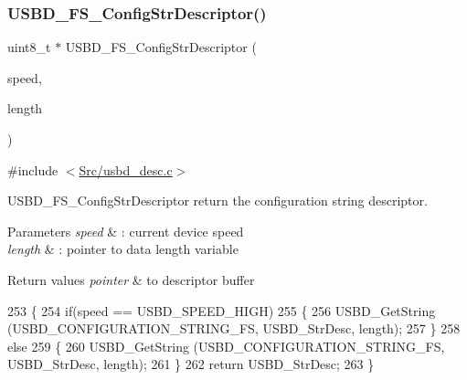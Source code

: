 \subsubsection{\texorpdfstring{U\+S\+B\+D\+\_\+\+F\+S\+\_\+\+Config\+Str\+Descriptor()}{USBD\_FS\_ConfigStrDescriptor()}}
{\footnotesize\ttfamily uint8\+\_\+t $\ast$ U\+S\+B\+D\+\_\+\+F\+S\+\_\+\+Config\+Str\+Descriptor (\begin{DoxyParamCaption}\item[{U\+S\+B\+D\+\_\+\+Speed\+Type\+Def}]{speed,  }\item[{uint16\+\_\+t $\ast$}]{length }\end{DoxyParamCaption})}



{\ttfamily \#include $<$\mbox{\hyperlink{usbd__desc_8c}{Src/usbd\+\_\+desc.\+c}}$>$}



U\+S\+B\+D\+\_\+\+F\+S\+\_\+\+Config\+Str\+Descriptor return the configuration string descriptor. 


\begin{DoxyParams}{Parameters}
{\em speed} & \+: current device speed \\
\hline
{\em length} & \+: pointer to data length variable \\
\hline
\end{DoxyParams}

\begin{DoxyRetVals}{Return values}
{\em pointer} & to descriptor buffer \\
\hline
\end{DoxyRetVals}

\begin{DoxyCode}
253 \{
254   \textcolor{keywordflow}{if}(speed  == USBD\_SPEED\_HIGH)
255   \{  
256     USBD\_GetString (USBD\_CONFIGURATION\_STRING\_FS, USBD\_StrDesc, length);
257   \}
258   \textcolor{keywordflow}{else}
259   \{
260     USBD\_GetString (USBD\_CONFIGURATION\_STRING\_FS, USBD\_StrDesc, length); 
261   \}
262   \textcolor{keywordflow}{return} USBD\_StrDesc;  
263 \}
\end{DoxyCode}
\mbox{\label{group___u_s_b_d___d_e_s_c___private___functions_ga14798be38c08a37163e53167032485ff}} 
